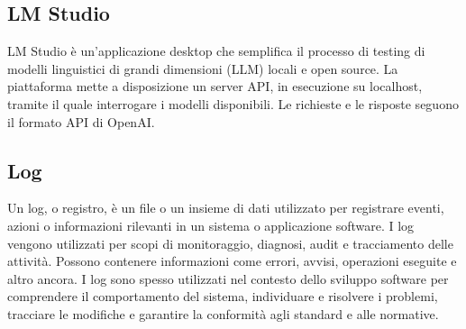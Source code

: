 \vspace{2em}
\subsection*{LM Studio}
\par LM Studio è un'applicazione desktop che semplifica il processo di testing di modelli linguistici di grandi dimensioni (LLM) locali e open source. La piattaforma mette a disposizione un server API, in esecuzione su localhost, tramite il quale interrogare i modelli disponibili. Le richieste e le risposte seguono il formato API di OpenAI.

\vspace{2em}
\subsection*{Log}
\par Un log, o registro, è un file o un insieme di dati utilizzato per registrare eventi, azioni o informazioni rilevanti in un sistema o applicazione software. I log vengono utilizzati per scopi di monitoraggio, diagnosi, audit e tracciamento delle attività. Possono contenere informazioni come errori, avvisi, operazioni eseguite e altro ancora. I log sono spesso utilizzati nel contesto dello sviluppo software per comprendere il comportamento del sistema, individuare e risolvere i problemi, tracciare le modifiche e garantire la conformità agli standard e alle normative.
